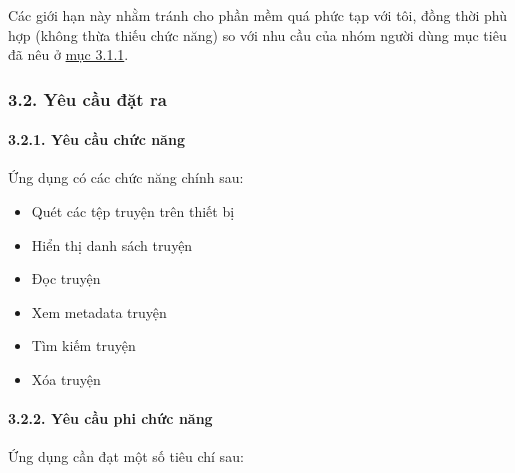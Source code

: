 \documentclass[
]{article}
\begin{document}
Các giới hạn này nhằm tránh cho phần mềm quá phức tạp với tôi, đồng thời
phù hợp (không thừa thiếu chức năng) so với nhu cầu của nhóm người dùng
mục tiêu đã nêu ở \protect\hyperlink{P3.1.1-users}{mục 3.1.1}.

\hypertarget{yuxeau-cux1ea7u-ux111ux1eb7t-ra}{%
\subsubsection{\texorpdfstring{3.2. Yêu cầu đặt ra
}{3.2. Yêu cầu đặt ra }}\label{yuxeau-cux1ea7u-ux111ux1eb7t-ra}}

\hypertarget{yuxeau-cux1ea7u-chux1ee9c-nux103ng}{%
\paragraph{\texorpdfstring{3.2.1. Yêu cầu chức năng
}{3.2.1. Yêu cầu chức năng }}\label{yuxeau-cux1ea7u-chux1ee9c-nux103ng}}

Ứng dụng có các chức năng chính sau:

\begin{itemize}
\item
  Quét các tệp truyện trên thiết bị
\item
  Hiển thị danh sách truyện
\item
  Đọc truyện
\item
  Xem metadata truyện
\item
  Tìm kiếm truyện
\item
  Xóa truyện
\end{itemize}

\hypertarget{yuxeau-cux1ea7u-phi-chux1ee9c-nux103ng}{%
\paragraph{\texorpdfstring{3.2.2. Yêu cầu phi chức năng
}{3.2.2. Yêu cầu phi chức năng }}\label{yuxeau-cux1ea7u-phi-chux1ee9c-nux103ng}}

Ứng dụng cần đạt một số tiêu chí sau:
\end{document}
